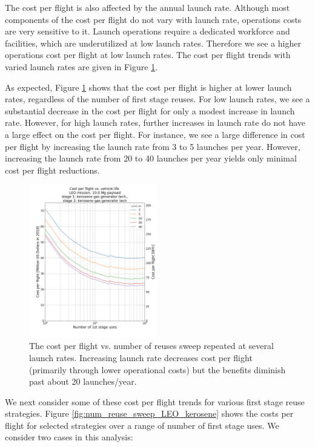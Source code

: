 \documentclass[conf]{new-aiaa}
\begin{document}
\begin{multicols}{2}
The cost per flight is also affected by the annual launch rate. Although most components of the cost per flight do not vary with launch rate, operations costs are very sensitive to it. Launch operations require a dedicated workforce and facilities, which are underutilized at low launch rates. Therefore we see a higher operations cost per flight at low launch rates. The cost per flight trends with varied launch rates are given in Figure \ref{fig:cpf_reuses_sweep_vary_launch_rate}. 


As expected, Figure \ref{fig:cpf_reuses_sweep_vary_launch_rate} shows that the cost per flight is higher at lower launch rates, regardless of the number of first stage reuses. For low launch rates, we see a substantial decrease in the cost per flight for only a modest increase in launch rate. However, for high launch rates, further increases in launch rate do not have a large effect on the cost per flight. For instance, we see a large difference in cost per flight by increasing the launch rate from 3 to 5 launches per year. However, increasing the launch rate from 20 to 40 launches per year yields only minimal cost per flight reductions. 

\begin{figure}[H]
    \centering
    \includegraphics[width=0.5\textwidth]{../../lvreuse/analysis/combined/plots/cpf_reuses_sweep_vary_launch_rate}
    \caption{\label{fig:cpf_reuses_sweep_vary_launch_rate} The cost per flight vs. number of reuses sweep repeated at several launch rates. Increasing launch rate decreases cost per flight (primarily through lower operational costs) but the benefits diminish past about 20 launches/year.}
\end{figure}

We next consider some of these cost per flight trends for various first stage reuse strategies. Figure \ref{fig:num_reuse_sweep_LEO_kerosene} shows the costs per flight for selected strategies over a range of number of first stage uses. We consider two cases in this analysis: 


\end{multicols}
\end{document}
